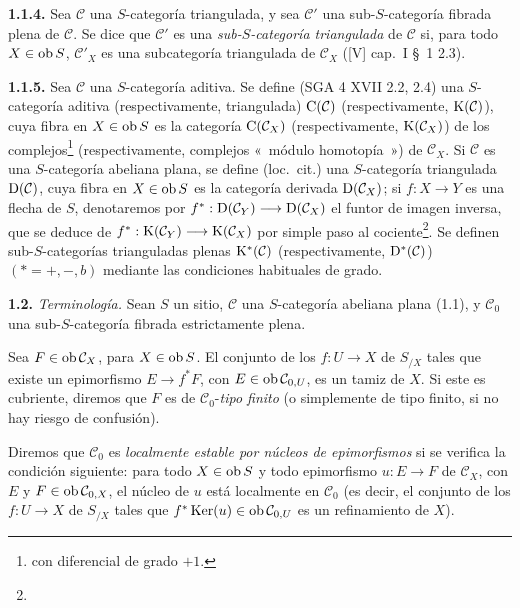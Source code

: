 \textbf{1.1.4.} Sea \(\mathcal C\) una \(S\)-categoría triangulada, y sea \(\mathcal C'\) una sub-\(S\)-categoría fibrada plena de \(\mathcal C\). Se dice que \(\mathcal C'\) es una \emph{sub-\(S\)-categoría triangulada} de \(\mathcal C\) si, para todo \(X\in\operatorname{ob} S\), \(\mathcal C'_X\) es una subcategoría triangulada de \(\mathcal C_X\) ([V] cap.\ I \S~1 2.3).

\textbf{1.1.5.} Sea \(\mathcal C\) una \(S\)-categoría aditiva. Se define (SGA 4 XVII 2.2, 2.4) una \(S\)-categoría aditiva (respectivamente, triangulada) \(\mathrm C(\mathcal C)\) (respectivamente, \(\mathrm K(\mathcal C)\)), cuya fibra en \(X\in\operatorname{ob} S\) es la categoría \(\mathrm C(\mathcal C_X)\) (respectivamente, \(\mathrm K(\mathcal C_X)\)) de los complejos\footnote{con diferencial de grado \(+1\).} (respectivamente, complejos «~módulo homotopía~») de \(\mathcal C_X\). Si \(\mathcal C\) es una \(S\)-categoría abeliana plana, se define (loc.\ cit.) una \(S\)-categoría triangulada \(\mathrm D(\mathcal C)\), cuya fibra en \(X\in\operatorname{ob} S\) es la categoría derivada \(\mathrm D(\mathcal C_X)\); si \(f:X\to Y\) es una flecha de \(S\), denotaremos por \(f^*:\mathrm D(\mathcal C_Y)\longrightarrow \mathrm D(\mathcal C_X)\) el funtor de imagen inversa, que se deduce de \(f^*:\mathrm K(\mathcal C_Y)\longrightarrow \mathrm K(\mathcal C_X)\) por simple paso al cociente\footnote{}. Se definen sub-\(S\)-categorías trianguladas plenas \(\mathrm K^*(\mathcal C)\) (respectivamente, \(\mathrm D^*(\mathcal C)\)) \((*=+,-,b)\) mediante las condiciones habituales de grado. %

\textbf{1.2.} \emph{Terminología.} Sean \(S\) un sitio, \(\mathcal C\) una \(S\)-categoría abeliana plana (1.1), y \(\mathcal C_0\) una sub-\(S\)-categoría fibrada estrictamente plena.

Sea \(F\in\operatorname{ob}\mathcal C_X\), para \(X\in\operatorname{ob} S\). El conjunto de los \(f:U\to X\) de \(S_{/X}\) tales que existe un epimorfismo \(E\longrightarrow f^*F\), con \(E\in\operatorname{ob}\mathcal C_{0,U}\), es un tamiz de \(X\). Si este es cubriente, diremos que \(F\) es de \(\mathcal C_0\)-\emph{tipo finito} (o simplemente de tipo finito, si no hay riesgo de confusión).

Diremos que \(\mathcal C_0\) es \emph{localmente estable por núcleos de epimorfismos} si se verifica la condición siguiente: para todo \(X\in\operatorname{ob} S\) y todo epimorfismo \(u:E\longrightarrow F\) de \(\mathcal C_X\), con \(E\) y \(F\in\operatorname{ob}\mathcal C_{0,X}\), el núcleo de \(u\) está localmente en \(\mathcal C_0\) (es decir, el conjunto de los \(f:U\to X\) de \(S_{/X}\) tales que \(f^*\operatorname{Ker}(u)\in\operatorname{ob}\mathcal C_{0,U}\) es un refinamiento de \(X\)).

